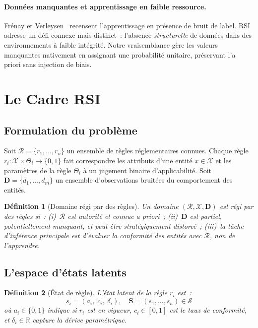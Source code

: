 \documentclass[letterpaper]{article}
\newtheorem{definition}{D\'efinition}
\begin{document}
\paragraph{Donn\'ees manquantes et apprentissage en faible ressource.}
Fr\'enay et Verleysen~\citeyearpar{frenay2014classification} recensent
l'apprentissage en pr\'esence de bruit de label. RSI adresse un d\'efi
connexe mais distinct~: l'absence \emph{structurelle} de donn\'ees dans
des environnements \`a faible int\'egrit\'e. Notre vraisemblance g\`ere
les valeurs manquantes nativement en assignant une probabilit\'e
unitaire, pr\'eservant l'a priori sans injection de biais.

\section{Le Cadre RSI}
\label{sec:framework}

\subsection{Formulation du probl\`eme}

Soit $\mathcal{R} = \{r_1, \ldots, r_n\}$ un ensemble de r\`egles
r\'eglementaires connues. Chaque r\`egle $r_i : \mathcal{X} \times
\Theta_i \to \{0,1\}$ fait correspondre les attributs d'une entit\'e
$x \in \mathcal{X}$ et les param\`etres de la r\`egle $\Theta_i$ \`a
un jugement binaire d'applicabilit\'e. Soit
$\mathbf{D} = \{d_1, \ldots, d_m\}$ un ensemble d'observations bruit\'ees
du comportement des entit\'es.

\begin{definition}[Domaine r\'egi par des r\`egles]
Un domaine $(\mathcal{R}, \mathcal{X}, \mathbf{D})$ est \emph{r\'egi
par des r\`egles} si~: (i)~$\mathcal{R}$ est autorit\'e et connue a
priori~; (ii)~$\mathbf{D}$ est partiel, potentiellement manquant, et
peut \^etre strat\'egiquement distorc\'e~; (iii)~la t\^ache d'inf\'erence
principale est d'\'evaluer la conformit\'e des entit\'es avec
$\mathcal{R}$, non de l'apprendre.
\end{definition}

\subsection{L'espace d'\'etats latents}

\begin{definition}[\'Etat de r\`egle]
L'\'etat latent de la r\`egle $r_i$ est~:
\[
  s_i = (a_i,\; c_i,\; \delta_i), \quad
  \mathbf{S} = (s_1, \ldots, s_n) \in \mathcal{S}
\]
o\`u $a_i \in \{0,1\}$ indique si $r_i$ est en vigueur, $c_i \in
[0,1]$ est le taux de conformit\'e, et $\delta_i \in \mathbb{R}$
capture la d\'erive param\'etrique.
\end{definition}
\end{document}
